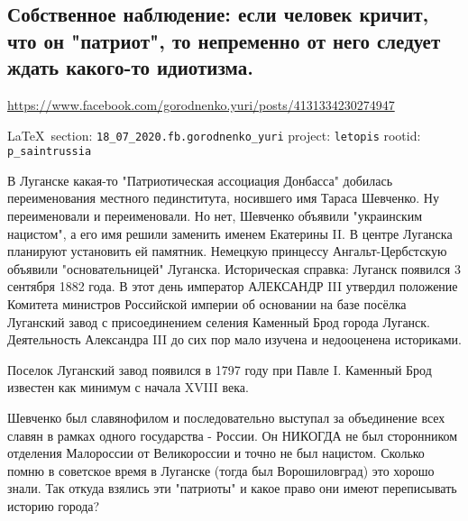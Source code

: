 
 
  
\subsection{Собственное наблюдение: если человек кричит, что он "патриот", то непременно от него следует ждать какого-то идиотизма.}
\label{sec:18_07_2020.fb.gorodnenko_yuri}
\url{https://www.facebook.com/gorodnenko.yuri/posts/4131334230274947}

\vspace{0.5cm}
{\small\LaTeX~section: \verb|18_07_2020.fb.gorodnenko_yuri| project: \verb|letopis| rootid: \verb|p_saintrussia|}
\vspace{0.5cm}

В Луганске какая-то "Патриотическая ассоциация Донбасса" добилась
переименования местного пединститута, носившего имя Тараса Шевченко. Ну
переименовали и переименовали. Но нет, Шевченко объявили "украинским нацистом",
а его имя решили заменить именем Екатерины II. В центре Луганска планируют
установить ей памятник. Немецкую принцессу Ангальт-Цербстскую объявили
"основательницей" Луганска.  Историческая справка: Луганск появился 3 сентября
1882 года. В этот день император АЛЕКСАНДР III утвердил положение Комитета
министров Российской империи об основании на базе посёлка Луганский завод с
присоединением селения Каменный Брод города Луганск. Деятельность Александра
III до сих пор мало изучена и недооценена историками.

Поселок Луганский завод появился в 1797 году при Павле I. Каменный Брод
известен как минимум с начала XVIII века.

Шевченко был славянофилом и последовательно выступал за объединение всех славян
в рамках одного государства - России. Он НИКОГДА не был сторонником отделения
Малороссии от Великороссии и точно не был нацистом.  Сколько помню в советское
время в Луганске (тогда был Ворошиловград) это хорошо знали. Так откуда взялись
эти "патриоты" и какое право они имеют переписывать историю города?
  
